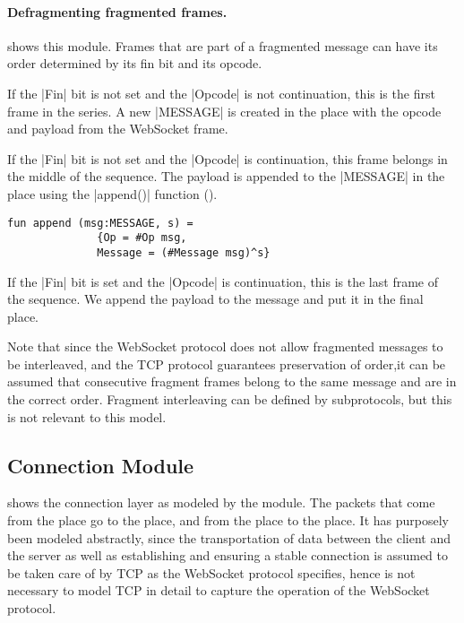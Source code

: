 		\paragraph{Defragmenting fragmented frames.}
			
			 shows this module. Frames that are part of a fragmented
			message can have its order determined by its fin bit and its opcode.
			
			If the |Fin| bit is not set and the |Opcode| is not continuation, this is the
			first frame in the series. A new |MESSAGE| is created in the
			 place with the opcode and payload from the WebSocket frame.
			
			If the |Fin| bit is not set and the |Opcode| is continuation, this frame
			belongs in the middle of the sequence. The payload is appended to the
			|MESSAGE| in the  place using the |append()|
			function ().
			
			\begin{lstlisting}[label=lst:append,caption=append,gobble=3,float=h]
			fun append (msg:MESSAGE, s) = 
			  {Op = #Op msg,
			  Message = (#Message msg)^s}
			\end{lstlisting}
			
			If the |Fin| bit is set and the |Opcode| is continuation, this is the last
			frame of the sequence. We append the payload to the message and put it in the final
			 place. 
			
			Note that since the WebSocket protocol does not allow fragmented messages to
			be interleaved, and the TCP protocol guarantees preservation of order,it
			can be assumed that consecutive fragment frames belong to the same message
			and are in the correct order.
			Fragment interleaving can be defined by subprotocols, but this is not
			relevant to this model.
			
\subsection{Connection Module}

	
	 shows the connection layer as modeled by the
	 module. The packets that come from the  place go to the  place, and from the
	 place to the  place. It has
	purposely been modeled abstractly, since the transportation of data between the
	client and the server as well as establishing and ensuring a stable
	connection is assumed to be taken care of by TCP as the WebSocket protocol
	specifies, hence is not necessary to model TCP in detail to capture the
	operation of the WebSocket protocol.
	
